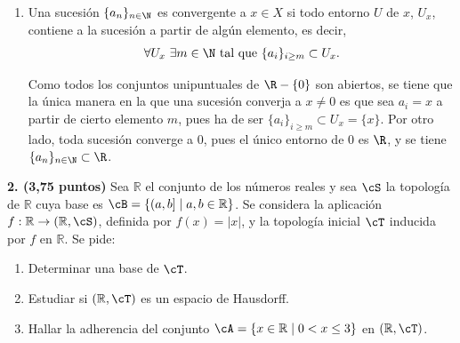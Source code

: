 \begin{solucion}
\begin{enumerate}[label=\alph*)]
        \item Una sucesión $\{a_n\}_{n\in \N}$ es convergente a $x \in X$ si todo entorno $U$ de $x$, $U_x$, contiene a la sucesión a partir de algún elemento, es decir,
        \[
            \forall U_x \ \exists m \in \N\text{ tal que }\{a_i\}_{i\geq m} \subset U_x. 
        \]

        Como todos los conjuntos unipuntuales de $\R - \{0\}$ son abiertos, se tiene que la única manera en la que una sucesión converja a $x \neq 0$ es que sea $a_i = x$ a partir de cierto elemento $m$, pues ha de ser $\{a_i\}_{i\geq m} \subset U_x = \{x\}$. Por otro lado, toda sucesión converge a $0$, pues el único entorno de $0$ es $\R$, y se tiene $\{a_n\}_{n\in\N} \subset \R$.
    \end{enumerate}
\end{solucion}


\begin{enunciado}
    \hypertarget{2023 A 2}{}
    \textbf{2. (3,75 puntos)} Sea \(\mathbb{R}\) el conjunto de los números reales y sea $\cS$ la topología de \(\mathbb{R}\) cuya base es \(\cB = \{(a,b] \mid a,b \in \mathbb{R}\}\). Se considera la aplicación $f : \mathbb{R} \to (\mathbb{R}, \cS)$, definida por \(f(x) = |x|\), y la topología inicial \(\cT\) inducida por \(f\) en \(\mathbb{R}\). Se pide:
    \begin{enumerate}[label=\alph*)]
        \item Determinar una base de \(\cT\).
        \item Estudiar si \((\mathbb{R}, \cT)\) es un espacio de Hausdorff.
        \item Hallar la adherencia del conjunto \(\cA = \{x \in \mathbb{R} \mid 0 < x \le 3\}\) en \((\mathbb{R}, \cT)\).
    \end{enumerate}
\end{enunciado}

